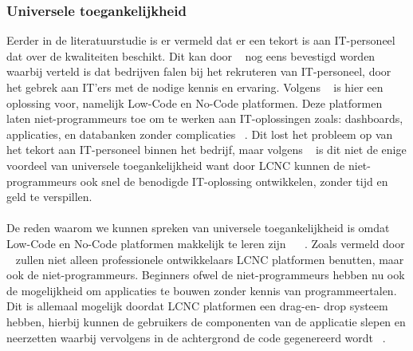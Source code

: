\subsubsection{Universele toegankelijkheid}
\label{subsec:universele-toegankelijkheid}
Eerder in de literatuurstudie is er vermeld dat er een tekort is aan IT-personeel dat over de kwaliteiten beschikt. 
Dit kan door ~\textcite{Sufi_2023} nog eens bevestigd worden waarbij verteld is dat bedrijven falen bij het rekruteren van IT-personeel, door het gebrek aan 
IT'ers met de nodige kennis en ervaring. Volgens ~\textcite{Sufi_2023} is hier een oplossing voor, namelijk Low-Code en No-Code platformen. 
Deze platformen laten niet-programmeurs toe om te werken aan IT-oplossingen zoals: dashboards, applicaties, 
en databanken zonder complicaties ~\autocite{Sufi_2023}. Dit lost het probleem op van het tekort aan IT-personeel binnen het bedrijf, 
maar volgens ~\textcite{Sufi_2023} is dit niet de enige voordeel van universele toegankelijkheid want door LCNC kunnen de niet-programmeurs ook snel de 
benodigde IT-oplossing ontwikkelen, zonder tijd en geld te verspillen.
\\
\\
De reden waarom we kunnen spreken van universele toegankelijkheid is omdat Low-Code en No-Code platformen makkelijk te leren zijn ~\autocite{ALSAADI_2021} ~\autocite{Sufi_2023}. 
Zoals vermeld door ~\textcite{ALSAADI_2021} zullen niet alleen professionele ontwikkelaars LCNC platformen benutten, maar ook de niet-programmeurs. 
Beginners ofwel de niet-programmeurs hebben nu ook de mogelijkheid om applicaties te bouwen zonder kennis van programmeertalen. 
Dit is allemaal mogelijk doordat LCNC platformen een drag-en- drop systeem hebben, hierbij kunnen 
de gebruikers de componenten van de applicatie slepen en neerzetten waarbij vervolgens in de achtergrond de code gegenereerd wordt ~\autocite{ALSAADI_2021}.
